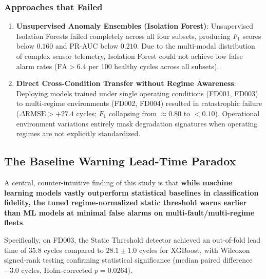\subsubsection{Approaches that Failed}
\begin{enumerate}
    \item \textbf{Unsupervised Anomaly Ensembles (Isolation Forest)}: Unsupervised Isolation Forests failed completely across all four subsets, producing $F_1$ scores below $0.160$ and PR-AUC below $0.210$. Due to the multi-modal distribution of complex sensor telemetry, Isolation Forest could not achieve low false alarm rates ($\text{FA} > 6.4$ per 100 healthy cycles across all subsets).
    \item \textbf{Direct Cross-Condition Transfer without Regime Awareness}: Deploying models trained under single operating conditions (FD001, FD003) to multi-regime environments (FD002, FD004) resulted in catastrophic failure ($\Delta\text{RMSE} > +27.4$ cycles; $F_1$ collapsing from $\approx 0.80$ to $<0.10$). Operational environment variations entirely mask degradation signatures when operating regimes are not explicitly standardized.
\end{enumerate}

\subsection{The Baseline Warning Lead-Time Paradox}
A central, counter-intuitive finding of this study is that \textbf{while machine learning models vastly outperform statistical baselines in classification fidelity, the tuned regime-normalized static threshold warns earlier than ML models at minimal false alarms on multi-fault/multi-regime fleets}.

Specifically, on FD003, the Static Threshold detector achieved an out-of-fold lead time of $35.8$ cycles compared to $28.1 \pm 1.0$ cycles for XGBoost, with Wilcoxon signed-rank testing confirming statistical significance (median paired difference $-3.0$ cycles, Holm-corrected $p = 0.0264$).

